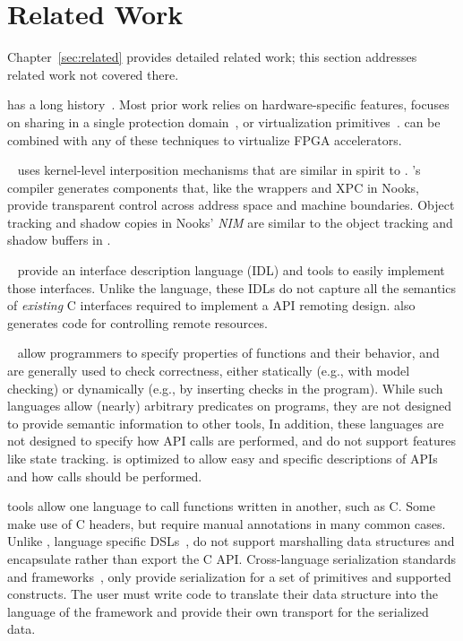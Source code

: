 \section{Related Work}
\label{s:related}

Chapter~\ref{sec:related} provides detailed related work; this section
addresses related work not covered there.

has a long history~\cite{codezero,plessl2005zippy,
score,tartan06asplos,virtualRC,huang09fpgavirt,brant2012zuma,rcmw,
intermediate-fabrics}. Most prior work relies on hardware-specific features,
focuses on sharing in a single protection domain~\cite{amorphos}, or
virtualization primitives~\cite{cascade}. \AvA can be combined with any of
these techniques to virtualize FPGA accelerators.

~\cite{nooks} uses kernel-level interposition
mechanisms that are similar in spirit to \AvA. \AvA's compiler generates
components that, like the wrappers and XPC in Nooks, provide transparent
control across address space and machine boundaries. Object tracking and
shadow copies in Nooks' \emph{NIM} are similar to the object tracking and
shadow buffers in \AvA.

~\cite{grpc,thrift,corba,Yang1996} provide an
interface description language (IDL) and tools to easily implement those
interfaces. Unlike the \CAvA language, these IDLs do not capture all the
semantics of \emph{existing} C interfaces required to implement a \hira
API remoting design. \CAvA also generates code for controlling remote
resources.

~\cite{mssal} allow programmers
to specify properties of functions and their behavior, and are generally used
to check correctness, either statically (e.g., with model checking) or
dynamically (e.g., by inserting checks in the program). While such languages
allow (nearly) arbitrary predicates on programs, they are not designed to
provide semantic information to other tools, In addition, these languages are
not designed to specify how API calls are performed, and do not support
features like state tracking. \Lapis is optimized to allow easy and
specific descriptions of APIs and how calls should be performed.

 tools allow one language to call
functions written in another, such as C.
Some~\cite{swig} make use of C headers, but require manual annotations in many
common cases. Unlike \AvA, language specific DSLs~\cite{cython,jna},
do not support marshalling data structures and encapsulate rather than export
the C API.
Cross-language serialization standards and frameworks~\cite{protobuf, msgpack,
ecma404}, only provide serialization for a set of primitives and supported
constructs. The user must write code to translate their data structure into
the language of the framework and provide their own transport for the
serialized data.